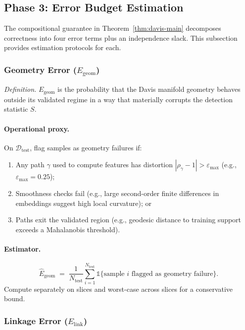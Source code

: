 \documentclass[11pt]{article}
\theoremstyle{remark}
\theoremstyle{plain}
\begin{document}
\subsection{Phase 3: Error Budget Estimation}
\label{subsec:error-budget-estimation}

The compositional guarantee in Theorem~\ref{thm:davis-main} decomposes correctness into four error terms plus an independence slack. This subsection provides estimation protocols for each.

\subsubsection{Geometry Error ($E_{\mathrm{geom}}$)}
\label{subsubsec:egeom}

\emph{Definition.} $E_{\mathrm{geom}}$ is the probability that the Davis manifold geometry behaves outside its validated regime in a way that materially corrupts the detection statistic $S$.

\paragraph{Operational proxy.}
On $\mathcal{D}_{\mathrm{test}}$, flag samples as geometry failures if:
\begin{enumerate}[label=(\alph*),leftmargin=*]
  \item Any path $\gamma$ used to compute features has distortion $|\rho_\gamma - 1| > \varepsilon_{\text{max}}$ (e.g., $\varepsilon_{\text{max}} = 0.25$);
  \item Smoothness checks fail (e.g., large second-order finite differences in embeddings suggest high local curvature); or
  \item Paths exit the validated region (e.g., geodesic distance to training support exceeds a Mahalanobis threshold).
\end{enumerate}

\paragraph{Estimator.}
\[
\hat E_{\mathrm{geom}}
\;=\;
\frac{1}{N_{\mathrm{test}}} \sum_{i=1}^{N_{\mathrm{test}}} \mathbb{1}\{\text{sample } i \text{ flagged as geometry failure}\}.
\]
Compute separately on slices and worst-case across slices for a conservative bound.

\subsubsection{Linkage Error ($E_{\mathrm{link}}$)}
\label{subsubsec:elink}
\end{document}
